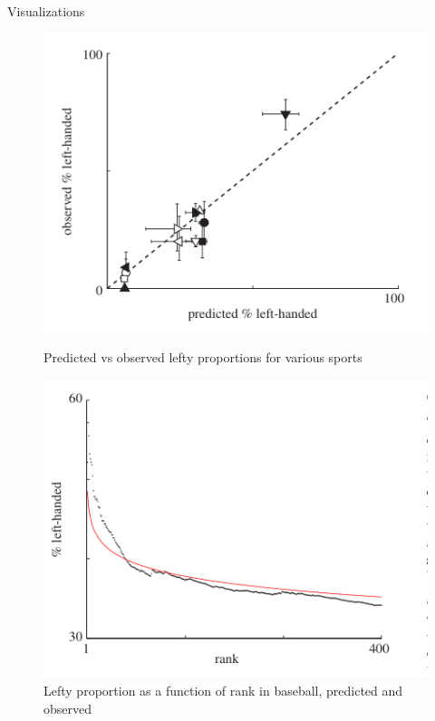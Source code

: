 \documentclass{beamer}
\begin{document}
    \begin{frame}{Visualizations}
      \begin{figure}
        \centering
        \begin{minipage}{.5\textwidth}
            \centering
            \includegraphics[width=1\linewidth]{ObVSPredLH}
            \caption{Predicted vs observed lefty proportions for various sports}
        \end{minipage}%
        \begin{minipage}{.5\textwidth}
            \centering
            \includegraphics[width=1\linewidth]{CumuFracLH}
            \caption{Lefty proportion as a function of rank in baseball, predicted and observed}
        \end{minipage}
        
    \end{figure}
    \end{frame}
\end{document}
